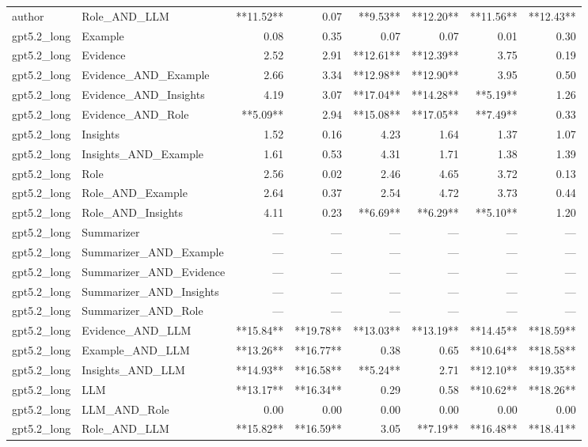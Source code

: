\begin{tabular}{llrrrrrr}
author & Role_AND_LLM & **11.52** & 0.07 & **9.53** & **12.20** & **11.56** & **12.43** \\
gpt5.2_long & Example & 0.08 & 0.35 & 0.07 & 0.07 & 0.01 & 0.30 \\
gpt5.2_long & Evidence & 2.52 & 2.91 & **12.61** & **12.39** & 3.75 & 0.19 \\
gpt5.2_long & Evidence_AND_Example & 2.66 & 3.34 & **12.98** & **12.90** & 3.95 & 0.50 \\
gpt5.2_long & Evidence_AND_Insights & 4.19 & 3.07 & **17.04** & **14.28** & **5.19** & 1.26 \\
gpt5.2_long & Evidence_AND_Role & **5.09** & 2.94 & **15.08** & **17.05** & **7.49** & 0.33 \\
gpt5.2_long & Insights & 1.52 & 0.16 & 4.23 & 1.64 & 1.37 & 1.07 \\
gpt5.2_long & Insights_AND_Example & 1.61 & 0.53 & 4.31 & 1.71 & 1.38 & 1.39 \\
gpt5.2_long & Role & 2.56 & 0.02 & 2.46 & 4.65 & 3.72 & 0.13 \\
gpt5.2_long & Role_AND_Example & 2.64 & 0.37 & 2.54 & 4.72 & 3.73 & 0.44 \\
gpt5.2_long & Role_AND_Insights & 4.11 & 0.23 & **6.69** & **6.29** & **5.10** & 1.20 \\
gpt5.2_long & Summarizer & — & — & — & — & — & — \\
gpt5.2_long & Summarizer_AND_Example & — & — & — & — & — & — \\
gpt5.2_long & Summarizer_AND_Evidence & — & — & — & — & — & — \\
gpt5.2_long & Summarizer_AND_Insights & — & — & — & — & — & — \\
gpt5.2_long & Summarizer_AND_Role & — & — & — & — & — & — \\
gpt5.2_long & Evidence_AND_LLM & **15.84** & **19.78** & **13.03** & **13.19** & **14.45** & **18.59** \\
gpt5.2_long & Example_AND_LLM & **13.26** & **16.77** & 0.38 & 0.65 & **10.64** & **18.58** \\
gpt5.2_long & Insights_AND_LLM & **14.93** & **16.58** & **5.24** & 2.71 & **12.10** & **19.35** \\
gpt5.2_long & LLM & **13.17** & **16.34** & 0.29 & 0.58 & **10.62** & **18.26** \\
gpt5.2_long & LLM_AND_Role & 0.00 & 0.00 & 0.00 & 0.00 & 0.00 & 0.00 \\
gpt5.2_long & Role_AND_LLM & **15.82** & **16.59** & 3.05 & **7.19** & **16.48** & **18.41** \\

\end{tabular}
